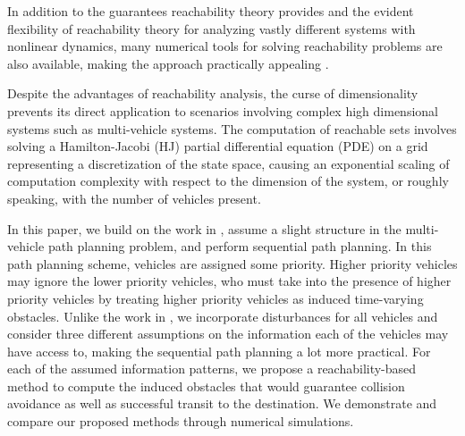 In addition to the guarantees reachability theory provides and the evident flexibility of reachability theory for analyzing vastly different systems with nonlinear dynamics, many numerical tools for solving reachability problems are also available, making the approach practically appealing \cite{Mitchell05, Sethian96, Osher02, LSToolbox}.

Despite the advantages of reachability analysis, the curse of dimensionality prevents its direct application to scenarios involving complex high dimensional systems such as multi-vehicle systems. The computation of reachable sets involves solving a Hamilton-Jacobi (HJ) partial differential equation (PDE) on a grid representing a discretization of the state space, causing an exponential scaling of computation complexity with respect to the dimension of the system, or roughly speaking, with the number of vehicles present.

In this paper, we build on the work in \cite{Chen15}, assume a slight structure in the multi-vehicle path planning problem, and perform sequential path planning. In this path planning scheme, vehicles are assigned some priority. Higher priority vehicles may ignore the lower priority vehicles, who must take into the presence of higher priority vehicles by treating higher priority vehicles as induced time-varying obstacles. Unlike the work in \cite{Chen15}, we incorporate disturbances for all vehicles and consider three different assumptions on the information each of the vehicles may have access to, making the sequential path planning a lot more practical. For each of the assumed information patterns, we propose a reachability-based method to compute the induced obstacles that would guarantee collision avoidance as well as successful transit to the destination. We demonstrate and compare our proposed methods through numerical simulations.